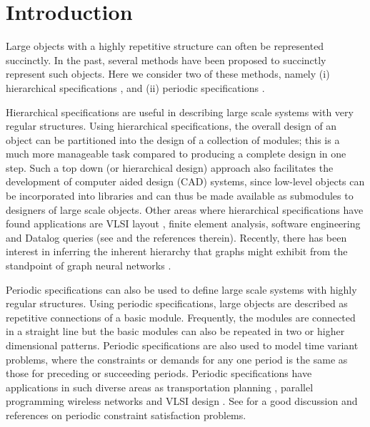 \section{Introduction}
\label{sec:intro}

Large objects with a highly repetitive structure can often be represented
succinctly.
In the past, several methods have been proposed to succinctly 
represent such objects.
Here we consider two of these methods, namely
(i) hierarchical specifications  
\cite{Ga82,GW83,LW92,BOW83,RH93},
and (ii) periodic specifications 
\cite{CM91,HW92,IS87,KO91,KS88,Or82a,Wa93}.
 


Hierarchical specifications are useful in describing large scale systems with
very regular structures. 
Using hierarchical specifications, the overall design of an object can be 
partitioned into the design of a collection of modules;
this is a 
much more manageable task compared to producing a complete design in one step.
Such a top down (or hierarchical design) approach 
also facilitates the development of computer aided design (CAD) systems, since
low-level objects can be  incorporated into libraries and can thus be made
available as submodules to designers of large scale  objects.
Other areas where hierarchical specifications have found applications are
VLSI layout \cite{HLW92,HW92,RH93},  
finite element analysis, software engineering and Datalog queries 
(see \cite{HLW92,Ma94,marathe1995complexity,bottcher2020simulation,goller2005fixpoint,brenguier2012comparison,lohrey2012model,tapken1999implementing} 
and the references therein).  Recently, there has been interest in
inferring the inherent hierarchy that graphs might exhibit from the
standpoint of graph neural networks \cite{ying2018hierarchical}.

Periodic specifications
can also be used to define large scale systems with highly regular structures.
Using  periodic specifications, 
large objects are  described as repetitive connections of a basic module.
Frequently, the modules are connected in a straight line 
but the basic modules can also  be repeated in two or higher
dimensional patterns. Periodic specifications are also used to 
model time variant  problems,  where the constraints
or demands  for any one period is the same as those for preceding or 
succeeding periods. 
Periodic specifications 
have applications in such diverse areas  as  transportation planning
\cite{Or82a,HLW92,marathe1995complexity,drucker2019cyclic,ho2015cyclic},
parallel programming \cite{HLW92,KMW67} wireless networks \cite{andreou2002radiocoloring} and 
VLSI design \cite{IS87,IS88}. 
See \cite{chen2003periodic,chen2005periodic} for a good discussion and 
references on periodic constraint satisfaction problems.

